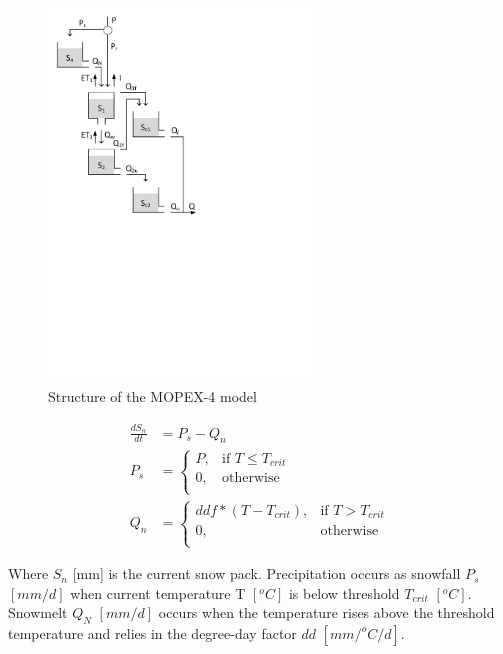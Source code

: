 { 																	%
\begin{figure}
\includegraphics[trim=1cm 13cm 7cm 1cm,width=7cm,keepaspectratio]{./files/32_schematic.pdf}
\caption{Structure of the MOPEX-4 model} \label{fig:32_schematic}
\end{figure}

\begin{align}
	\frac{dS_n}{dt} &= P_s-Q_{n} \\
	P_s &= \begin{cases}
		P, &\text{if } T \leq T_{crit} \\
		0, & \text{otherwise} \\
	\end{cases} \\
	Q_n &=\begin{cases}
		ddf*(T-T_{crit}), &\text{if } T > T_{crit} \\
		0, & \text{otherwise} \\
	\end{cases}
\end{align}

Where $S_n$ [mm] is the current snow pack. Precipitation occurs as snowfall $P_s$ $[mm/d]$ when current temperature T $[^oC]$ is below threshold $T_{crit}$ $[^oC]$. Snowmelt $Q_N$ $[mm/d]$ occurs when the temperature rises above the threshold temperature and relies in the degree-day factor $dd$ $[mm/^oC/d]$.

} %
\vspace{5cm}

